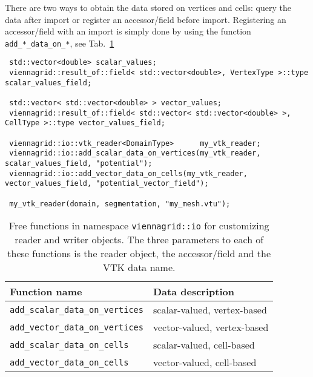 
There are two ways to obtain the data stored on vertices and cells: query the data after import or register an accessor/field before import.
Registering an accessor/field with an import is simply done by using the function \lstinline|add_*_data_on_*|, see Tab.~\ref{tab:customizing-io}

 \begin{lstlisting}
 std::vector<double> scalar_values;
 viennagrid::result_of::field< std::vector<double>, VertexType >::type scalar_values_field;
 
 std::vector< std::vector<double> > vector_values;
 viennagrid::result_of::field< std::vector< std::vector<double> >, CellType >::type vector_values_field;
 
 viennagrid::io::vtk_reader<DomainType>      my_vtk_reader;
 viennagrid::io::add_scalar_data_on_vertices(my_vtk_reader, scalar_values_field, "potential");
 viennagrid::io::add_vector_data_on_cells(my_vtk_reader, vector_values_field, "potential_vector_field");
 
 my_vtk_reader(domain, segmentation, "my_mesh.vtu");
 \end{lstlisting}
 
 

 \begin{table}[tb]
 \begin{center}
  \begin{tabular}{|l|l|}
   \hline
   Function name & Data description \\
   \hline
   \lstinline|add_scalar_data_on_vertices| & scalar-valued, vertex-based \\
   \lstinline|add_vector_data_on_vertices| & vector-valued, vertex-based \\
   \hline
   \lstinline|add_scalar_data_on_cells| & scalar-valued, cell-based \\
   \lstinline|add_vector_data_on_cells| & vector-valued, cell-based \\
   \hline
  \end{tabular}
 \end{center}
 \caption{Free functions in namespace \lstinline|viennagrid::io| for customizing reader and writer objects. The three parameters to each of these functions is the reader object, the accessor/field and the VTK data name.}
 \label{tab:customizing-io}
 \end{table}
 
